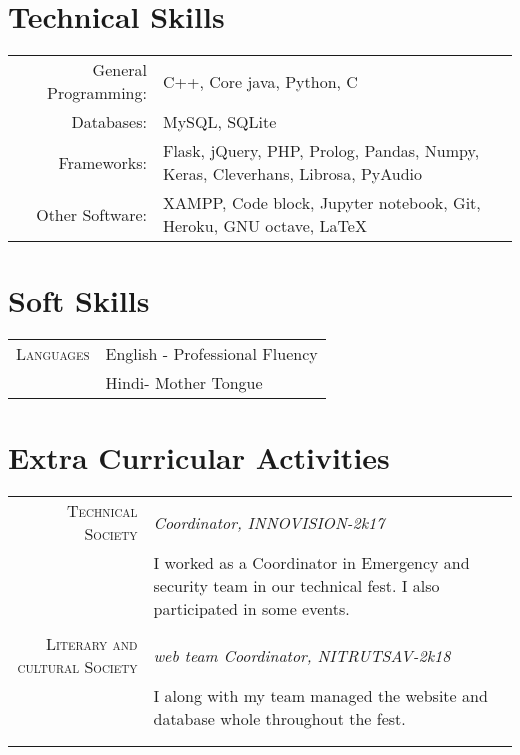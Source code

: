 \documentclass[a4paper,10pt]{article}
\begin{document}
\section{Technical Skills}
\begin{tabular}{rl}
General Programming:& C++, Core java, Python, C\\
Databases:& MySQL, SQLite\\
Frameworks:& Flask, jQuery, PHP, Prolog, Pandas, Numpy, Keras, Cleverhans, Librosa, PyAudio \\
Other Software: & XAMPP, Code block, Jupyter notebook, Git, Heroku, GNU octave, LaTeX\\
 \end{tabular}
 
\section{Soft Skills}
\begin{tabular}{rl}
\textsc{Languages} &English - Professional Fluency\\
&Hindi- Mother Tongue\\
\end{tabular}

\section{Extra Curricular Activities}
\begin{tabular}{r|p{11cm}}
\textsc{Technical Society} & \emph{Coordinator, INNOVISION-2k17}\\&\footnotesize{I worked as a Coordinator in Emergency and security team in our technical fest. I also participated in some events.}\\ \\
\textsc{Literary and cultural Society} & \emph{web team Coordinator, NITRUTSAV-2k18}\\&\footnotesize{I along with my team managed the website and database whole throughout the fest.}\\ \\
\multicolumn{2}{c}{}
\end{tabular}


\end{document}
